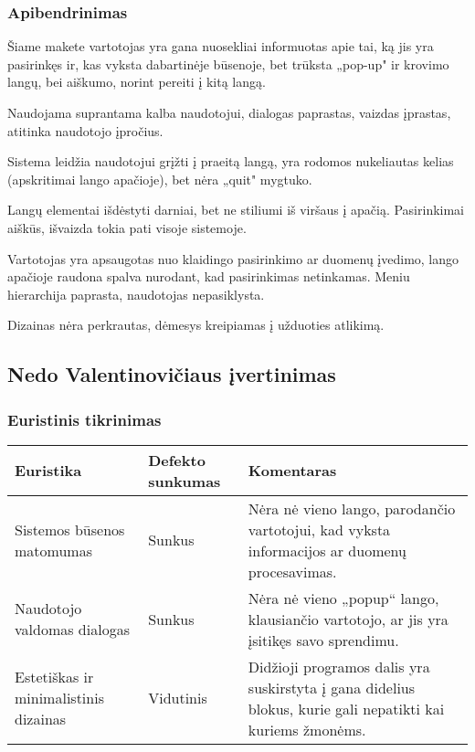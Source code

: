 \documentclass{VUMIFPSkursinis}
\begin{document}
\subsubsection{Apibendrinimas}
Šiame makete vartotojas yra gana nuosekliai informuotas apie tai, ką jis yra pasirinkęs ir, kas vyksta dabartinėje būsenoje, bet trūksta „pop-up" ir krovimo langų, bei aiškumo, norint pereiti į kitą langą.

Naudojama suprantama kalba naudotojui, dialogas paprastas, vaizdas įprastas, atitinka naudotojo įpročius.

Sistema leidžia naudotojui grįžti į praeitą langą, yra rodomos nukeliautas kelias (apskritimai lango apačioje), bet nėra „quit" mygtuko.

Langų elementai išdėstyti darniai, bet ne stiliumi iš viršaus į apačią. Pasirinkimai aiškūs, išvaizda tokia pati visoje sistemoje.

Vartotojas yra apsaugotas nuo klaidingo pasirinkimo ar duomenų įvedimo, lango apačioje raudona spalva nurodant, kad pasirinkimas netinkamas. Meniu hierarchija paprasta, naudotojas nepasiklysta.

Dizainas nėra perkrautas, dėmesys kreipiamas į užduoties atlikimą.

\subsection{Nedo Valentinovičiaus įvertinimas}
\subsubsection{Euristinis tikrinimas}
\begin{center}
 \begin{tabular}{|| p{4cm} | p{4cm} | p{8cm} ||} 
 \hline
 Euristika & Defekto sunkumas & Komentaras \\
 \hline\hline
 Sistemos būsenos matomumas & Sunkus & Nėra nė vieno lango, parodančio vartotojui, kad vyksta informacijos ar duomenų procesavimas. \\ 
 \hline
 Naudotojo valdomas dialogas & Sunkus & Nėra nė vieno „popup“ lango, klausiančio vartotojo, ar jis yra įsitikęs savo sprendimu. \\ 
 \hline
 Estetiškas ir minimalistinis dizainas & Vidutinis & Didžioji programos dalis yra suskirstyta į gana didelius blokus, kurie gali nepatikti kai kuriems žmonėms. \\ 
 \hline
\end{tabular}	
\end{center}
\end{document}
